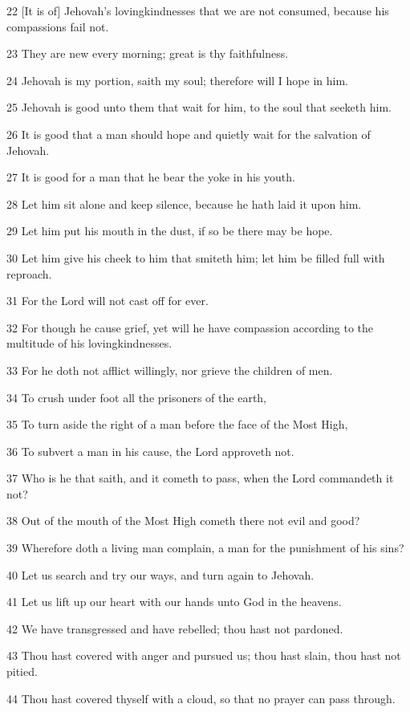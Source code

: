 \par 22 [It is of] Jehovah's lovingkindnesses that we are not consumed, because his compassions fail not.
\par 23 They are new every morning; great is thy faithfulness.
\par 24 Jehovah is my portion, saith my soul; therefore will I hope in him.
\par 25 Jehovah is good unto them that wait for him, to the soul that seeketh him.
\par 26 It is good that a man should hope and quietly wait for the salvation of Jehovah.
\par 27 It is good for a man that he bear the yoke in his youth.
\par 28 Let him sit alone and keep silence, because he hath laid it upon him.
\par 29 Let him put his mouth in the dust, if so be there may be hope.
\par 30 Let him give his cheek to him that smiteth him; let him be filled full with reproach.
\par 31 For the Lord will not cast off for ever.
\par 32 For though he cause grief, yet will he have compassion according to the multitude of his lovingkindnesses.
\par 33 For he doth not afflict willingly, nor grieve the children of men.
\par 34 To crush under foot all the prisoners of the earth,
\par 35 To turn aside the right of a man before the face of the Most High,
\par 36 To subvert a man in his cause, the Lord approveth not.
\par 37 Who is he that saith, and it cometh to pass, when the Lord commandeth it not?
\par 38 Out of the mouth of the Most High cometh there not evil and good?
\par 39 Wherefore doth a living man complain, a man for the punishment of his sins?
\par 40 Let us search and try our ways, and turn again to Jehovah.
\par 41 Let us lift up our heart with our hands unto God in the heavens.
\par 42 We have transgressed and have rebelled; thou hast not pardoned.
\par 43 Thou hast covered with anger and pursued us; thou hast slain, thou hast not pitied.
\par 44 Thou hast covered thyself with a cloud, so that no prayer can pass through.
